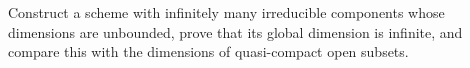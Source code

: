 \begin{problem}\label{chall:vi30-03}
Construct a scheme with infinitely many irreducible components whose dimensions are unbounded, prove that its global dimension is infinite, and compare this with the dimensions of quasi-compact open subsets.
\end{problem}
